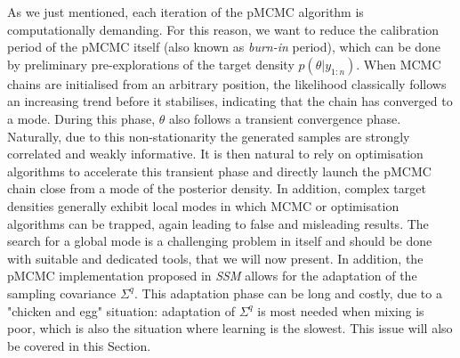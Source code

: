\documentclass[a4paper,11pt,titlepage]{article}
\theoremstyle{plain} %
\begin{document}
As we just mentioned, each iteration of the pMCMC algorithm is computationally demanding. For this reason, we want to reduce the calibration period of the pMCMC itself (also known as \emph{burn-in} period), which can be done by preliminary pre-explorations of the target density $p(\theta|y_{1:n})$. When MCMC chains are initialised from an arbitrary position, the likelihood classically follows an increasing trend  before it stabilises, indicating that the chain has converged to a mode. During this phase, $\theta$ also follows a transient convergence phase. Naturally, due to this non-stationarity the generated samples are strongly correlated and weakly informative. It is then natural to rely on optimisation algorithms to accelerate this transient phase and directly launch the pMCMC chain close from a mode of the posterior density. In addition, complex target densities generally exhibit local modes in which MCMC or optimisation algorithms can be trapped, again leading to false and misleading results. The search for a global mode is a challenging problem in itself and should be done with suitable and dedicated tools, that we will now present. In addition, the pMCMC implementation proposed in \emph{SSM} allows for the adaptation of the sampling covariance $\Sigma^q$. This adaptation phase can be long and costly, due to a "chicken and egg" situation: adaptation of $\Sigma^q$ is most needed when mixing is poor, which is also the situation where learning is the slowest. This issue will also be covered in this Section.
\end{document}
